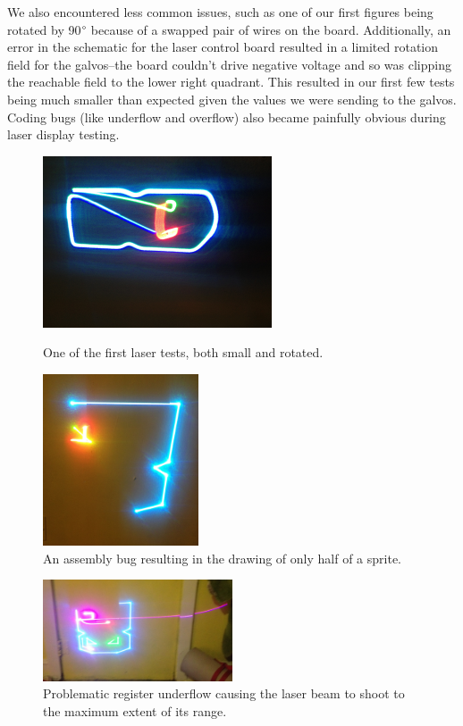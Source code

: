 \documentclass{article}
\begin{document}
We also encountered less common issues, such as one of our first figures being rotated by 90$\degree$ because of a swapped pair of wires on the board. Additionally, an error in the schematic for the laser control board resulted in a limited rotation field for the galvos--the board couldn't drive negative voltage and so was clipping the reachable field to the lower right quadrant. This resulted in our first few tests being much smaller than expected given the values we were sending to the galvos. Coding bugs (like underflow and overflow) also became painfully obvious during laser display testing.

\begin{figure}[H]
\centering
\begin{minipage}{.5\textwidth}
  \captionsetup{width=0.8\textwidth}
  \centering
  \includegraphics[height=2in]{laser_rotated}
  \caption{One of the first laser tests, both small and rotated.}
\end{minipage}%
\begin{minipage}{.5\textwidth}
  \captionsetup{width=0.8\textwidth}
  \centering
  \includegraphics[height=2in]{laser_derp}
  \caption{An assembly bug resulting in the drawing of only half of a sprite.}
\end{minipage}
\end{figure}

\begin{figure}[H]
\centering
\includegraphics[width=0.5\textwidth]{laser_underflow}
\caption{Problematic register underflow causing the laser beam to shoot to the maximum extent of its range.}
\end{figure}
\end{document}
